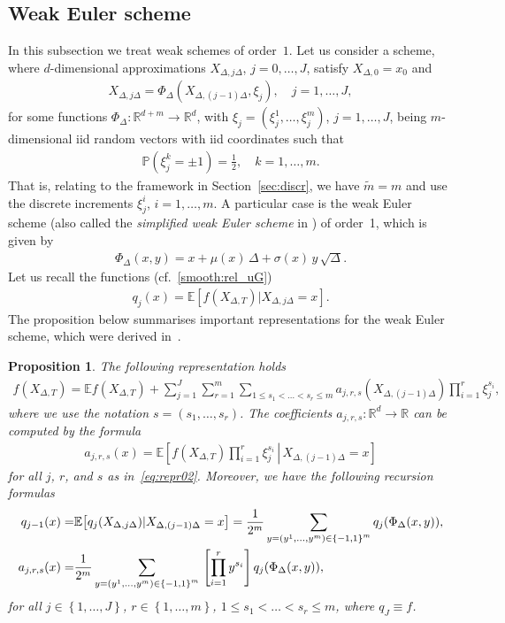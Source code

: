 \documentclass[11pt,a4paper]{amsart}
\theoremstyle{plain}
\newtheorem{proposition}[theorem]{Proposition}
\theoremstyle{definition}
\theoremstyle{remark}
\numberwithin{equation}{section}
\newcommand*{\EE}{\mathbb E}
\newcommand*{\PP}{\mathbb P}
\newcommand*{\bbR}{\mathbb R}
\begin{document}
\subsection{Weak Euler scheme}
\label{sec:first}
In this subsection we treat weak schemes of order~$1$.
Let us consider a scheme,
where $d$-dimensional approximations
$X_{\Delta,j\Delta}$,
$j=0,\ldots,J$, satisfy $X_{\Delta,0}=x_0$ and
\begin{align}
\label{eq:scheme_structure_md}
X_{\Delta,j\Delta}=
\Phi_{\Delta}(X_{\Delta,(j-1)\Delta},\xi_j),
\quad j=1,\ldots,J,
\end{align}
for some functions
$\Phi_{\Delta}\colon\bbR^{d+m}\to\bbR^d$,
with $\xi_j=(\xi_j^1,\ldots,\xi_j^m)$, $j=1,\ldots,J$,
being $m$-dimensional
iid random vectors with iid coordinates
such that
\begin{align*}
\PP\left(\xi_j^k=\pm1\right)=\frac12, \quad k=1,\ldots,m.
\end{align*}
That is, relating to the framework in Section~\ref{sec:discr}, we have $\tilde m=m$ and use the discrete increments $\xi_j^i$, $i=1,\ldots,m$.
A particular case is the weak Euler scheme (also called the
\emph{simplified weak Euler scheme}
in \cite[Section~14.1]{KP})
of order~1, which is given by
\begin{align}
\label{eq:PhiK=1}
\Phi_{\Delta}(x,y)
=x+\mu(x)\,\Delta+\sigma(x)\,y\,\sqrt{\Delta}.
\end{align}
Let us recall the functions (cf.~\eqref{smooth:rel_uG})
\begin{align*}
q_j(x)=\EE[f(X_{\Delta, T})|X_{\Delta,j\Delta}=x].
\end{align*}
The proposition below summarises important representations for the weak Euler scheme, which were derived in~\cite{belomestny2016variance}.
\begin{proposition}
\label{th:weak_md01}
The following representation holds
\begin{align}
\label{eq:repr02}
f(X_{\Delta,T})=\EE f(X_{\Delta,T})
+\sum_{j=1}^J
\sum_{r=1}^m
\sum_{1\le s_1<\ldots<s_r\le m}
a_{j,r,s}(X_{\Delta,(j-1)\Delta})
\prod_{i=1}^r \xi_j^{s_i},
\end{align}
where we use the notation
$s=(s_1,\ldots,s_r)$.
The coefficients
$a_{j,r,s}\colon\bbR^d\to\bbR$
can be computed by the formula
\begin{align}
\label{eq:coef05}
a_{j,r,s}(x)
=\EE\left[\left.
f(X_{\Delta,T}) \prod_{i=1}^r \xi_j^{s_i} 
\,\right|\,
X_{\Delta,(j-1)\Delta}=x
\right]
\end{align}
for all $j$, $r$, and $s$ as in~\eqref{eq:repr02}. Moreover, we have the following recursion formulas
\begin{align}
\notag
q_{j-1}(x)=&\EE\bigl[q_j(X_{\Delta, j\Delta})|X_{\Delta,(j-1)\Delta}=x\bigr]
=\frac{1}{2^{m}}\sum_{y=(y^{1},\ldots,y^{m})\in\left\{ -1,1\right\} ^{m}}q_j(\Phi_\Delta(x,y)),\\
\label{eq:coef05a}
a_{j,r,s}(x)=&\frac{1}{2^m}\sum_{y=(y^{1},\ldots,y^{m})\in\left\{ -1,1\right\} ^{m}}\,  \left [\prod_{i=1}^r y^{s_i}\right]
q_j(\Phi_\Delta(x,y)),
\end{align}
for all $j\in\left\{1,\ldots,J\right\}$, $r\in\left\{1,\ldots,m\right\}$, $1\le s_1<\ldots<s_r\le m$, where $q_J\equiv f$.
\end{proposition}
\end{document}
